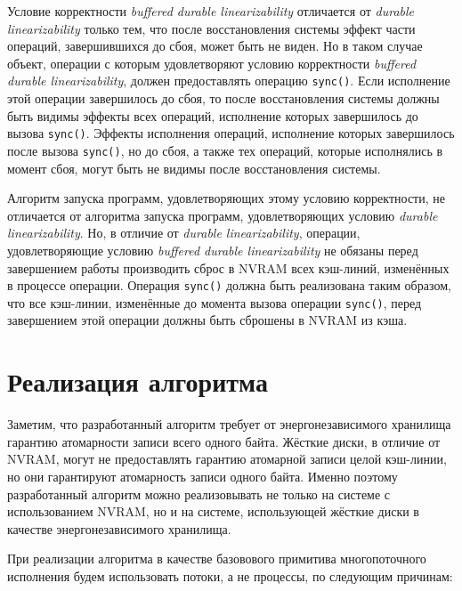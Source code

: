 \documentclass[times,specification,annotation]{itmo-student-thesis}
\begin{document}
Условие корректности \emph{buffered durable linearizability} отличается от \emph{durable linearizability} только тем, что после восстановления системы эффект части операций, завершившихся до сбоя, может быть не виден. Но в таком случае объект, операции с которым удовлетворяют условию корректности \emph{buffered durable linearizability}, должен предоставлять операцию \texttt{sync()}. Если исполнение этой операции завершилось до сбоя, то после восстановления системы должны быть видимы эффекты всех операций, исполнение которых завершилось до вызова \texttt{sync()}. Эффекты исполнения операций, исполнение которых завершилось после вызова \texttt{sync()}, но до сбоя, а также тех операций, которые исполнялись в момент сбоя, могут быть не видимы после восстановления системы.

Алгоритм запуска программ, удовлетворяющих этому условию корректности, не отличается от алгоритма запуска программ, удовлетворяющих условию \emph{durable linearizability}. Но, в отличие от \emph{durable linearizability}, операции, удовлетворяющие условию \emph{buffered durable linearizability} не обязаны перед завершением работы производить сброс в NVRAM всех кэш-линий, изменённых в процессе операции. Операция \texttt{sync()} должна быть реализована таким образом, что все кэш-линии, изменённые до момента вызова операции \texttt{sync()}, перед завершением этой операции должны быть сброшены в NVRAM из кэша.

\section{Реализация алгоритма}

Заметим, что разработанный алгоритм требует от энергонезависимого хранилища гарантию атомарности записи всего одного байта. Жёсткие диски, в отличие от NVRAM, могут не предоставлять гарантию атомарной записи целой кэш-линии, но они гарантируют атомарность записи одного байта. Именно поэтому разработанный алгоритм можно реализовывать не только на системе с использованием NVRAM, но и на системе, использующей жёсткие диски в качестве энергонезависимого хранилища. 

При реализации алгоритма в качестве базовового примитива многопоточного исполнения будем использовать потоки, а не процессы, по следующим причинам:
\end{document}
